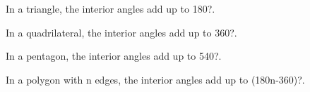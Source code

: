In a triangle, the interior angles add up to 180?.
\par
In a quadrilateral, the interior angles add up to 360?.
\par
In a pentagon, the interior angles add up to 540?.
\par
In a polygon with n edges, the interior angles add up to
(180n-360)?.